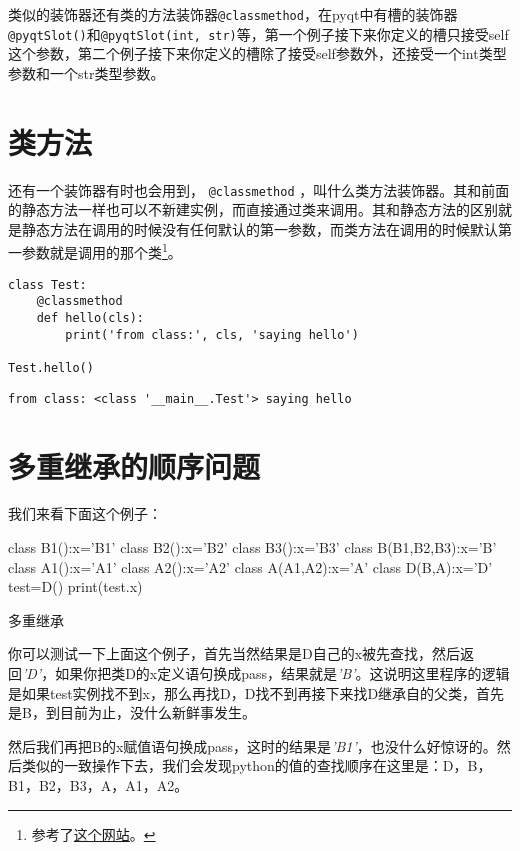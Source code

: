 \documentclass[12pt,oneside]{book}
\begin{document}
\begin{common-format}
类似的装饰器还有类的方法装饰器\verb+@classmethod+，在pyqt中有槽的装饰器\verb+@pyqtSlot()+和\verb+@pyqtSlot(int, str)+等，第一个例子接下来你定义的槽只接受self这个参数，第二个例子接下来你定义的槽除了接受self参数外，还接受一个int类型参数和一个str类型参数。



\section{类方法}
还有一个装饰器有时也会用到， \verb+@classmethod+ ，叫什么类方法装饰器。其和前面的静态方法一样也可以不新建实例，而直接通过类来调用。其和静态方法的区别就是静态方法在调用的时候没有任何默认的第一参数，而类方法在调用的时候默认第一参数就是调用的那个类\footnote{参考了\href{http://stackoverflow.com/questions/136097/what-is-the-difference-between-staticmethod-and-classmethod-in-python}{这个网站}。}。

\begin{Verbatim}
class Test:
    @classmethod
    def hello(cls):
        print('from class:', cls, 'saying hello')

Test.hello()
\end{Verbatim}
\begin{Verbatim}
from class: <class '__main__.Test'> saying hello
\end{Verbatim}



\section{多重继承的顺序问题}
我们来看下面这个例子：
\begin{tcbpython}[]
class B1():x='B1'
class B2():x='B2'
class B3():x='B3'
class B(B1,B2,B3):x='B'
class A1():x='A1'
class A2():x='A2'
class A(A1,A2):x='A'
class D(B,A):x='D'
test=D()
print(test.x)
\end{tcbpython}

\begin{fig}{多重继承}
\caption{多重继承}
\label{fig:多重继承}
\end{fig}

你可以测试一下上面这个例子，首先当然结果是D自己的x被先查找，然后返回\emph{'D'}，如果你把类D的x定义语句换成pass，结果就是\emph{'B'}。这说明这里程序的逻辑是如果test实例找不到x，那么再找D，D找不到再接下来找D继承自的父类，首先是B，到目前为止，没什么新鲜事发生。

然后我们再把B的x赋值语句换成pass，这时的结果是\emph{'B1'}，也没什么好惊讶的。然后类似的一致操作下去，我们会发现python的值的查找顺序在这里是：D，B，B1，B2，B3，A，A1，A2。


\end{common-format}
\end{document}
